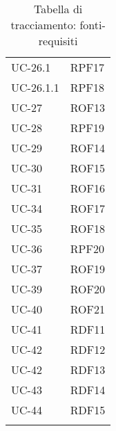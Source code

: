 \begin{longtable}{| p{5cm} | p{5cm} |}
		\rowcolor{LightGray}
		UC-26.1 & RPF17 \\
		UC-26.1.1 & RPF18\\
		\rowcolor{LightGray}
		UC-27 & ROF13 \\
		UC-28 & RPF19 \\
		\rowcolor{LightGray}
		UC-29 & ROF14 \\
		\rowcolor{LightGray}
		UC-30 & ROF15 \\
		UC-31 & ROF16 \\
		\rowcolor{LightGray}
		UC-34 & ROF17\\
		UC-35 & ROF18\\
		\rowcolor{LightGray}
		UC-36 & RPF20\\
		UC-37 & ROF19\\
		\rowcolor{LightGray}
		UC-39 & ROF20\\
		UC-40 & ROF21\\
		\rowcolor{LightGray}
		UC-41 & RDF11\\
		UC-42 & RDF12\\
		\rowcolor{LightGray}
		UC-42 & RDF13\\
		UC-43 & RDF14\\
		\rowcolor{LightGray}
		UC-44 & RDF15\\
		\hline
		\caption{Tabella di tracciamento: fonti-requisiti}
\end{longtable}

